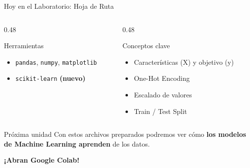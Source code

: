 \documentclass[aspectratio=169]{beamer}
\newcommand{\tech}[1]{\texttt{\textcolor{mainColor}{#1}}}
\begin{document}
\begin{frame}{Hoy en el Laboratorio: Hoja de Ruta}
  \vspace{0.3cm}
  \begin{columns}[T]
    \begin{column}{0.48\textwidth}
      \begin{conceptbox}{\faPython\enspace Herramientas}
        \small
        \begin{itemize}\setlength\itemsep{3pt}
          \item \tech{pandas}, \tech{numpy}, \tech{matplotlib}
          \item \tech{scikit-learn} \textbf{(nuevo)}
        \end{itemize}
      \end{conceptbox}
    \end{column}
    \begin{column}{0.48\textwidth}
      \begin{conceptbox}{\faKey\enspace Conceptos clave}
        \small
        \begin{itemize}\setlength\itemsep{2pt}
          \item Características (X) y objetivo (y)
          \item One-Hot Encoding
          \item Escalado de valores
          \item Train / Test Split
        \end{itemize}
      \end{conceptbox}
    \end{column}
  \end{columns}

  \vspace{0.2cm}
  \begin{alertblock}{\faArrowRight\enspace Próxima unidad}
    \centering\small
    Con estos archivos preparados podremos ver cómo \textbf{los modelos de Machine Learning aprenden} de los datos.
  \end{alertblock}

  \vspace{0.2cm}
  \centering
  \large\textcolor{mainColor}{\faArrowRight}\enspace
  \textbf{\normalsize ¡Abran Google Colab!}
\end{frame}
\end{document}
